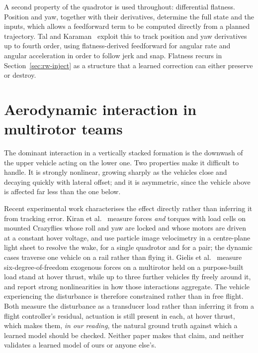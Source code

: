 A second property of the quadrotor is used throughout: differential flatness. Position and yaw,
together with their derivatives, determine the full state and the inputs, which allows a
feedforward term to be computed directly from a planned trajectory. Tal and
Karaman~\cite{tal2018indi} exploit this to track position and yaw derivatives up to fourth order,
using flatness-derived feedforward for angular rate and angular acceleration in order to follow
jerk and snap. Flatness recurs in Section~\ref{sec:rw-inject} as a structure that a learned
correction can either preserve or destroy.

\section{Aerodynamic interaction in multirotor teams}
\label{sec:rw-physics}

The dominant interaction in a vertically stacked formation is the downwash of the upper vehicle
acting on the lower one. Two properties make it difficult to handle. It is strongly nonlinear,
growing sharply as the vehicles close and decaying quickly with lateral offset; and it is
asymmetric, since the vehicle above is affected far less than the one below.

Recent experimental work characterises the effect directly rather than inferring it from tracking
error. Kiran et al.~\cite{kiran2025downwash} measure forces \emph{and} torques with load cells on
mounted Crazyflies whose roll and yaw are locked and whose motors are driven at a constant hover
voltage, and use particle image velocimetry in a centre-plane light sheet to resolve the wake, for
a single quadrotor and for a pair; the dynamic cases traverse one vehicle on a rail rather than
flying it. Gielis et al.~\cite{gielis2023aggregate} measure
six-degree-of-freedom exogenous forces on a multirotor held on a purpose-built load stand at hover
thrust, while up to three further vehicles fly freely around it, and report strong nonlinearities
in how those interactions aggregate. The vehicle experiencing the disturbance is therefore
constrained rather than in free flight. Both measure the disturbance as a transducer load rather
than inferring it from a flight controller's residual, actuation is still present in each, at
hover thrust, which makes them, \emph{in our reading}, the natural ground truth against which a
learned model should be checked. Neither paper makes that claim, and neither validates a learned
model of ours or anyone else's.

